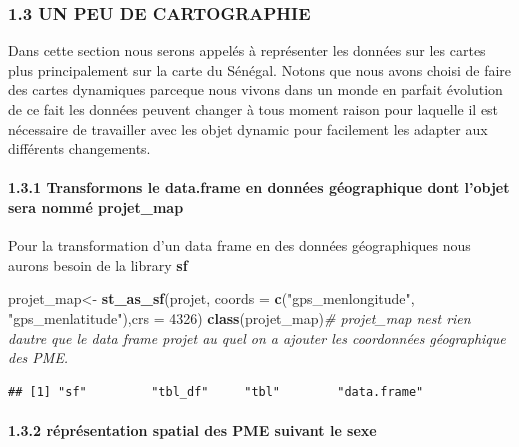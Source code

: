 \documentclass[
]{article}
\newenvironment{Shaded}{\begin{snugshade}}{\end{snugshade}}
\newcommand{\AttributeTok}[1]{\textcolor[rgb]{0.13,0.29,0.53}{#1}}
\newcommand{\CommentTok}[1]{\textcolor[rgb]{0.56,0.35,0.01}{\textit{#1}}}
\newcommand{\DecValTok}[1]{\textcolor[rgb]{0.00,0.00,0.81}{#1}}
\newcommand{\FunctionTok}[1]{\textcolor[rgb]{0.13,0.29,0.53}{\textbf{#1}}}
\newcommand{\NormalTok}[1]{#1}
\newcommand{\OtherTok}[1]{\textcolor[rgb]{0.56,0.35,0.01}{#1}}
\newcommand{\StringTok}[1]{\textcolor[rgb]{0.31,0.60,0.02}{#1}}
\begin{document}
\hypertarget{un-peu-de-cartographie}{%
\subsubsection{1.3 UN PEU DE
CARTOGRAPHIE}\label{un-peu-de-cartographie}}

Dans cette section nous serons appelés à représenter les données sur les
cartes plus principalement sur la carte du Sénégal. Notons que nous
avons choisi de faire des cartes dynamiques parceque nous vivons dans un
monde en parfait évolution de ce fait les données peuvent changer à tous
moment raison pour laquelle il est nécessaire de travailler avec les
objet dynamic pour facilement les adapter aux différents changements.

\hypertarget{transformons-le-data.frame-en-donnuxe9es-guxe9ographique-dont-lobjet-sera-nommuxe9-projet_map}{%
\paragraph{1.3.1 Transformons le data.frame en données géographique dont
l'objet sera nommé
projet\_map}\label{transformons-le-data.frame-en-donnuxe9es-guxe9ographique-dont-lobjet-sera-nommuxe9-projet_map}}

Pour la transformation d'un data frame en des données géographiques nous
aurons besoin de la library \textbf{sf}

\begin{Shaded}
\begin{Highlighting}[]
\NormalTok{projet\_map}\OtherTok{\textless{}{-}} \FunctionTok{st\_as\_sf}\NormalTok{(projet, }\AttributeTok{coords =} \FunctionTok{c}\NormalTok{(}\StringTok{"gps\_menlongitude"}\NormalTok{, }\StringTok{"gps\_menlatitude"}\NormalTok{),}\AttributeTok{crs =} \DecValTok{4326}\NormalTok{)}
\FunctionTok{class}\NormalTok{(projet\_map)}\CommentTok{\# projet\_map n\textquotesingle{}est rien d\textquotesingle{}autre que le data frame projet au quel on a ajouter les coordonnées géographique des PME.}
\end{Highlighting}
\end{Shaded}

\begin{verbatim}
## [1] "sf"         "tbl_df"     "tbl"        "data.frame"
\end{verbatim}

\hypertarget{ruxe9pruxe9sentation-spatial-des-pme-suivant-le-sexe}{%
\paragraph{1.3.2 réprésentation spatial des PME suivant le
sexe}\label{ruxe9pruxe9sentation-spatial-des-pme-suivant-le-sexe}}
\end{document}
